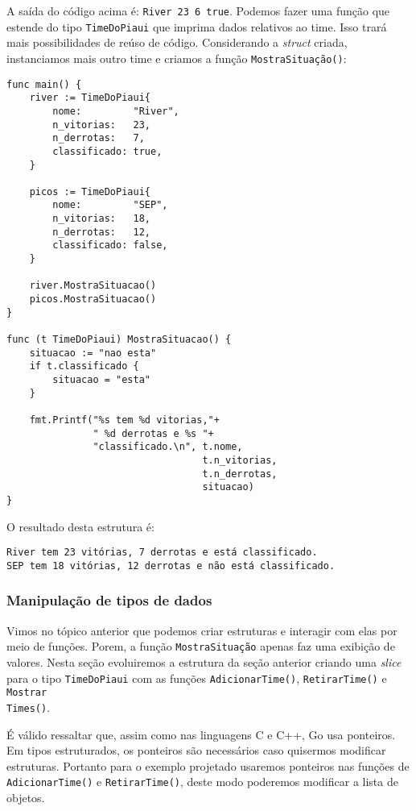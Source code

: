 \documentclass{SBCbookchapter}
\begin{document}
A saída do código acima é: \texttt{{River 23 6 true}}. Podemos fazer uma função que estende do tipo \texttt{TimeDoPiaui} que imprima dados relativos ao time. Isso trará mais possibilidades de reúso de código. Considerando a \textit{struct} criada, instanciamos mais outro time e criamos a função \texttt{MostraSituação()}:

\begin{lstlisting}
func main() {
	river := TimeDoPiaui{
		nome:         "River",
		n_vitorias:   23,
		n_derrotas:   7,
		classificado: true,
	}

	picos := TimeDoPiaui{
		nome:         "SEP",
		n_vitorias:   18,
		n_derrotas:   12,
		classificado: false,
	}

	river.MostraSituacao()
	picos.MostraSituacao()
}

func (t TimeDoPiaui) MostraSituacao() {
	situacao := "nao esta"
	if t.classificado {
		situacao = "esta"
	}
	
	fmt.Printf("%s tem %d vitorias,"+
			   " %d derrotas e %s "+
		   	   "classificado.\n", t.nome,
								  t.n_vitorias,
								  t.n_derrotas,
								  situacao)
}

\end{lstlisting}

O resultado desta estrutura é:

\noindent\texttt{River tem 23 vitórias, 7 derrotas e está classificado.}\\
\texttt{SEP tem 18 vitórias, 12 derrotas e não está classificado.}

\subsubsection{Manipulação de tipos de dados}

Vimos no tópico anterior que podemos criar estruturas e interagir com elas por meio de funções. Porem, a função \texttt{MostraSituação} apenas faz uma exibição de valores. Nesta seção evoluiremos a estrutura da seção anterior criando uma \textit{slice} para o tipo \texttt{TimeDoPiaui} com as funções \texttt{AdicionarTime()}, \texttt{RetirarTime()} e \texttt{Mostrar\\Times()}. 

É válido ressaltar que, assim como nas linguagens C e C++, Go usa ponteiros. Em tipos estruturados, os ponteiros são necessários caso quisermos modificar estruturas. Portanto para o exemplo projetado usaremos ponteiros nas funções de \texttt{AdicionarTime()} e \texttt{RetirarTime()}, deste modo poderemos modificar a lista de objetos.
\end{document}
